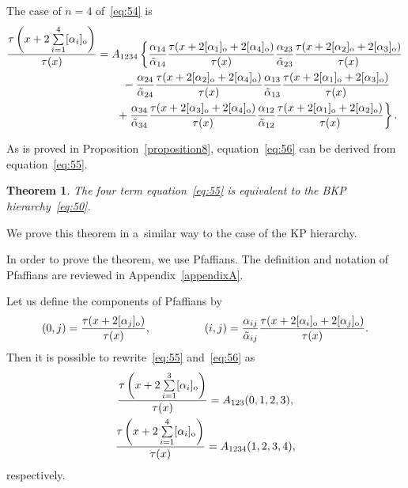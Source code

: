 \documentclass[11pt]{article}
\newtheorem{theorem}{Theorem}
\begin{document}
\begin{example}
The case of $n=4$ of~\eqref{eq:54} is
\begin{gather}
\frac{\tau\left(x+2\sum\limits_{i=1}^{4}[\alpha_i]_{\rm o}\right)}{\tau(x)}
=A_{1234}\left\{\frac{\alpha_{14}}{\tilde{\alpha}_{14}}
\frac{\tau(x+2[\alpha_1]_{\rm o}+2[\alpha_4]_{\rm o})}{\tau(x)}\frac{\alpha_{23}}{\tilde{\alpha}_{23}}
\frac{\tau(x+2[\alpha_2]_{\rm o}+2[\alpha_3]_{\rm o})}{\tau(x)}\right.
\nonumber
\\
\hphantom{\frac{\tau\left(x+2\sum\limits_{i=1}^{4}[\alpha_i]_{\rm o}\right)}{\tau(x)}=}{}
-\frac{\alpha_{24}}{\tilde{\alpha}_{24}}\frac{\tau(x+2[\alpha_2]_{\rm o}+2[\alpha_4]_{\rm o})}{\tau(x)}
\frac{\alpha_{13}}{\tilde{\alpha}_{13}}\frac{\tau(x+2[\alpha_1]_{\rm o}+2[\alpha_3]_{\rm o})}{\tau(x)}\nonumber
\\
\left.
\hphantom{\frac{\tau\left(x+2\sum\limits_{i=1}^{4}[\alpha_i]_{\rm o}\right)}{\tau(x)}=}{}
+\frac{\alpha_{34}}{\tilde{\alpha}_{34}}\frac{\tau(x+2[\alpha_3]_{\rm o}+2[\alpha_4]_{\rm o})}{\tau(x)}\frac{\alpha_{12}
}{\tilde{\alpha}_{12}}\frac{\tau(x+2[\alpha_1]_{\rm o}+2[\alpha_2]_{\rm o})}{\tau(x)}\right\}.
\label{eq:56}
\end{gather}
\end{example}

 As is proved in Proposition~\ref{proposition8}, equation~\eqref{eq:56} can be derived from equation~\eqref{eq:55}.
\begin{theorem}\label{theorem3}
The four term equation~\eqref{eq:55} is equivalent to the BKP hierarchy~\eqref{eq:50}.
\end{theorem}

We prove this theorem in a~similar way to the case of the KP hierarchy.

In order to prove the theorem, we use Pfaf\/f\/ians.
The def\/inition and notation of Pfaf\/f\/ians are reviewed in Appendix~\ref{appendixA}.

Let us def\/ine the components of Pfaf\/f\/ians by
\begin{gather*}%
(0,j)=\frac{\tau(x+2[\alpha_j]_{\rm o})}{\tau(x)},\qquad \hskip1cm(i,j)=\frac{\alpha_{ij}}{\tilde{\alpha}_{ij}}
\frac{\tau(x+2[\alpha_i]_{\rm o}+2[\alpha_j]_{\rm o})}{\tau(x)}.
\end{gather*}
Then it is possible to rewrite~\eqref{eq:55} and~\eqref{eq:56} as
\begin{gather}
\frac{\tau\left(x+2\sum\limits_{i=1}^{3}[\alpha_i]_{\rm o}\right)}{\tau(x)}=A_{123}(0,1,2,3),
\label{eq:58}
\\
\frac{\tau\left(x+2\sum\limits_{i=1}^{4}[\alpha_i]_{\rm o}\right)}{\tau(x)}=A_{1234}(1,2,3,4),
\label{eq:59}
\end{gather}
respectively.
\end{document}
